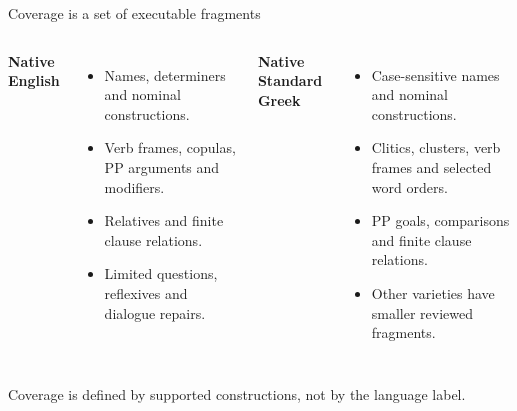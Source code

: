 \documentclass[aspectratio=169,11pt]{beamer}
\newcommand{\keypoint}[1]{\begin{block}{}#1\end{block}}
\begin{document}
\begin{frame}{Coverage is a set of executable fragments}
  \color{Ink}
  \begin{columns}[T,onlytextwidth]
      \textbf{Native English}\medskip
      \begin{itemize}\setlength\itemsep{5pt}
        \item Names, determiners and nominal constructions.
        \item Verb frames, copulas, PP arguments and modifiers.
        \item Relatives and finite clause relations.
        \item Limited questions, reflexives and dialogue repairs.
      \end{itemize}
      \textbf{Native Standard Greek}\medskip
      \begin{itemize}\setlength\itemsep{5pt}
        \item Case-sensitive names and nominal constructions.
        \item Clitics, clusters, verb frames and selected word orders.
        \item PP goals, comparisons and finite clause relations.
        \item Other varieties have smaller reviewed fragments.
      \end{itemize}
  \end{columns}
  \vspace{2mm}\keypoint{Coverage is defined by supported constructions, not by the language label.}
\end{frame}
\end{document}
